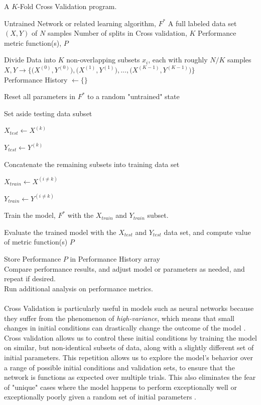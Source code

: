 \documentclass[12pt,letterpaper]{article}
\begin{document}
\begin{algorithm}[H]
\caption{A $K$-Fold Cross Validation program.}
\label{alg-CrossValidation}
\begin{algorithmic}
\REQUIRE Untrained Network or related learning algorithm, $F^*$
\REQUIRE A full labeled data set $(X,Y)$ of $N$ samples
\REQUIRE Number of splits in Cross validation, $K$
\REQUIRE Performance metric function(s), $P$

Divide Data into $K$ non-overlapping subsets $x_{i}$, each with roughly $N/K$ samples \\
$X,Y \rightarrow \Big\{ \big(X^{(0)},Y^{(0)}\big) , \big(X^{(1)},Y^{(1)}\big) , ... , \big(X^{(K-1)},Y^{(K-1)}\big) \Big\}$ \\
Performance History $\leftarrow \{\}$

	\item Reset all parameters in $F^*$ to a random "untrained" state
	\item Set aside testing data subset
	\item $X_{test} \leftarrow X^{(k)}$
	\item $Y_{test} \leftarrow Y^{(k)}$
	\item Concatenate the remaining subsets into training data set
	\item $X_{train} \leftarrow X^{(i \neq k)}$
	\item $Y_{train} \leftarrow Y^{(i \neq k)}$
	\item Train the model, $F^*$ with the $X_{train}$ and $Y_{train}$ subset.
	\item Evaluate the trained model with the $X_{test}$ and $Y_{test}$ data set, and compute value of metric function(s) $P$
	\item Store Performance $P$ in Performance History array
\ENDFOR \\
Compare performance results, and adjust model or parameters as needed, and repeat if desired. \\
Run additional analysis on performance metrics.
\end{algorithmic}
\end{algorithm}

\paragraph*{}Cross Validation is particularly useful in models such as neural networks because they suffer from the phenomenon of \textit{high-variance}, which means that small changes in initial conditions can drastically change the outcome of the model \cite{James}. Cross validation allows us to control these initial conditions by training the model on similar, but non-identical subsets of data, along with a slightly different set of initial parameters. This repetition allows us to explore the model's behavior over a range of possible initial conditions and validation sets, to ensure that the network is functions as expected over multiple trials. This also eliminates the fear of "unique" cases where the model happens to perform exceptionally well or exceptionally poorly given a random set of initial parameters \cite{Geron}.
\end{document}
